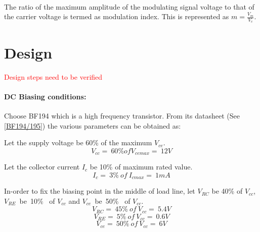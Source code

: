 \documentclass{book}
\begin{document}
\paragraph{}
The ratio of the maximum amplitude of the modulating signal voltage to that of the carrier voltage is termed as modulation index. This is represented as $m=\frac{V_m}{V_c}$.


\section*{Design}
\textcolor{red}{Design steps need to be verified}

\paragraph{DC Biasing conditions:}
Choose BF194 which is a high frequency transistor. From its datasheet (See \ref{BF194/195}) the various parameters can be obtained as:

 
Let the supply voltage be 60\% of the maximum $V_{ce}$.  \begin{equation}
V_{cc}=\ 60\% of V_{cemax}=\ 12 V
\end{equation}

\noindent Let the collector current $I_c$ be 10\% of maximum rated value.
\begin{equation}
I_{c}=\ 3\% \ of \ I_{cmax}=\ 1 mA
\end{equation}

\noindent In-order to fix the biasing point in the middle of load line, let $V_{RC}$ be 40\% of $V_{cc}$, $V_{RE}$\ be\ 10\% \ of $V_{cc}$ and $V_{ce}$\  be\ 50\% \ of $V_{cc}$.
\begin{equation}
V_{RC}=\ 45\% \ of \ V_{cc}=\ 5.4V
\end{equation}
\begin{equation}
V_{RE}=\ 5\% \ of \ V_{cc}=\ 0.6V
\end{equation}
\begin{equation}
V_{ce}=\ 50\% \ of \ V_{cc}=\ 6V
\end{equation}
\end{document}
